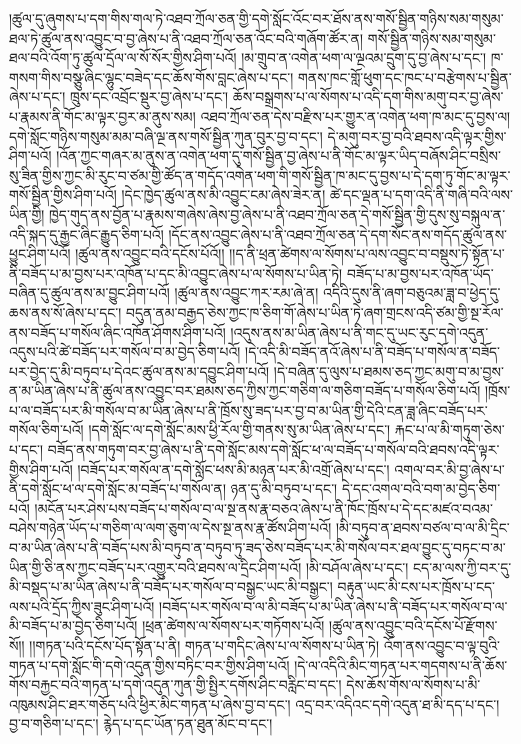 །ཚུལ་དུ་ཞུགས་པ་དག་གིས་གལ་ཏེ་འཐབ་ཀྲོལ་ཅན་གྱི་དགེ་སློང་འོང་བར་ཐོས་ནས་གསོ་སྦྱིན་གཉིས་སམ་གསུམ་ཐལ་ཏེ་ཚུལ་ནས་འབྱུང་བ་བྱ་ཞེས་པ་ནི་འཐབ་ཀྲོལ་ཅན་འོང་བའི་གཞོག་ཚོར་ན། གསོ་སྦྱིན་གཉིས་སམ་གསུམ་ཐལ་བའི་འོག་ཏུ་ཚུལ་དྲོལ་ལ་སོ་སོར་གྱིས་ཤིག་པའོ། །མ་གྲུབ་ན་འགེན་ཕག་ལ་ལྔའམ་དྲུག་དུ་བྱ་ཞེས་པ་དང་། ཁ་གསག་གིས་བསྩུ་ཞིང་ལྷུང་བཟེད་དང་ཆོས་གོས་བླང་ཞེས་པ་དང་། གནས་ཁང་གློ་ཕུག་དང་ཁང་པ་བརྩེགས་པ་སྦྱིན་ཞེས་པ་དང་། ཁྲུས་དང་འབྲོང་སྡུར་བྱ་ཞེས་པ་དང་། ཆོས་བསྒྲགས་པ་ལ་སོགས་པ་འདི་དག་གིས་མགུ་བར་བྱ་ཞེས་པ་རྣམས་ནི་གོང་མ་ལྟར་བྱར་མ་ནུས་སམ། འཐབ་ཀྲོལ་ཅན་དེས་བརྫིས་པར་གྱུར་ན་འགེན་ཕག་ཁ་མང་དུ་བྱས་ལ། དགེ་སློང་གཉིས་གསུམ་མམ་བཞི་ལྔ་ནས་གསོ་སྦྱིན་ཀུན་བུར་བྱ་བ་དང་། དེ་མགུ་བར་བྱ་བའི་ཐབས་འདི་ལྟར་གྱིས་ཤིག་པའོ། །འོན་ཀྱང་གཞར་མ་ནུས་ན་འགེན་ཕག་དུ་གསོ་སྦྱིན་བྱ་ཞེས་པ་ནི་གོང་མ་ལྟར་ཡིད་བཞོས་ཤིང་བསྲིས་སུ་ཟིན་གྱིས་ཀྱང་མི་རུང་བ་ཙམ་གྱི་ཚོད་ན་གདོད་འགེན་ཕག་གི་གསོ་སྦྱིན་ཁ་མང་དུ་བྱས་པ་དེ་དག་ཏུ་གོང་མ་ལྟར་གསོ་སྦྱིན་གྱིས་ཤིག་པའོ། །དེང་ཁྱེད་ཚུལ་ནས་མི་འབྱུང་ངམ་ཞེས་ཟེར་ན། ཚེ་དང་ལྡན་པ་དག་འདི་ནི་གཞི་བའི་ལས་ཡིན་གྱི། ཁྱེད་གུད་ནས་བྱོན་པ་རྣམས་གཞེས་ཞེས་བྱ་ཞེས་པ་ནི་འཐབ་ཀྲོལ་ཅན་དེ་གསོ་སྦྱིན་གྱི་དུས་སུ་བསྐུལ་ན་འདི་སྐད་དུ་རྒྱང་ཞིང་རྒྱུད་ཅིག་པའོ། །དོང་ནས་འབྱུང་ཞེས་པ་ནི་འཐབ་ཀྲོལ་ཅན་དེ་དག་སོང་ནས་གདོད་ཚུལ་ནས་ཕྱུང་ཤིག་པའོ། །ཚུལ་ནས་འབྱུང་བའི་དངོས་པོའོ།། །།ད་ནི་ཕྲན་ཚེགས་ལ་སོགས་པ་ལས་འབྱུང་བ་བསྡུས་ཏེ་སྟོན་པ་ནི་བཟོད་པ་མ་བྱས་པར་འཁོན་པ་དང་མི་འབྱུང་ཞེས་པ་ལ་སོགས་པ་ཡིན་ཏེ། བཟོད་པ་མ་བྱས་པར་འཁོན་ཡོད་བཞིན་དུ་ཚུལ་ནས་མ་བྱུང་ཤིག་པའོ། །ཚུལ་ནས་འབྱུང་ཀར་རམ་ཞེ་ན། འདིའི་དུས་ནི་ཞག་བཅུའམ་ཟླ་བ་ཕྱེད་དུ་ཆས་ནས་སོ་ཞེས་པ་དང་། བདུན་ནམ་བརྒྱད་ཅེས་ཀྱང་ཁ་ཅིག་གོ་ཞེས་པ་ཡིན་ཏེ་ཞག་གྲངས་འདི་ཙམ་གྱི་སྔ་རོལ་ནས་བཟོད་པ་གསོལ་ཞིང་འཁོན་ཤོགས་ཤིག་པའོ། །འདུས་ནས་མ་ཡིན་ཞེས་པ་ནི་གང་དུ་ཡང་རུང་དགེ་འདུན་འདུས་པའི་ཚེ་བཟོད་པར་གསོལ་བ་མ་བྱེད་ཅིག་པའོ། །དེ་འདི་མི་བཟོད་ནའོ་ཞེས་པ་ནི་བཟོད་པ་གསོལ་ན་བཟོད་པར་བྱེད་དུ་མི་བཏུབ་པ་དེའང་ཚུལ་ནས་མ་དབྱུང་ཤིག་པའོ། །དེ་བཞིན་དུ་ལུས་པ་ཐམས་ཅད་ཀྱང་མགུ་བ་མ་བྱས་ན་མ་ཡིན་ཞེས་པ་ནི་ཚུལ་ནས་འབྱུང་བར་ཐམས་ཅད་ཀྱིས་ཀྱང་གཅིག་ལ་གཅིག་བཟོད་པ་གསོལ་ཅིག་པའོ། །ཁྲོས་པ་ལ་བཟོད་པར་མི་གསོལ་བ་མ་ཡིན་ཞེས་པ་ནི་ཁྲོས་སུ་ཟད་པར་བྱ་བ་མ་ཡིན་གྱི་དེའི་ངན་ཟླ་ཞིང་བཟོད་པར་གསོལ་ཅིག་པའོ། །དགེ་སློང་ལ་དགེ་སློང་མས་ཕྱི་རོལ་གྱི་གནས་སུ་མ་ཡིན་ཞེས་པ་དང་། རྐང་པ་ལ་མི་གཏུག་ཅེས་པ་དང་། བཟོད་ནས་གཏུག་བར་བྱ་ཞེས་པ་ནི་དགེ་སློང་མས་དགེ་སློང་ཕ་ལ་བཟོད་པ་གསོལ་བའི་ཐབས་འདི་ལྟར་གྱིས་ཤིག་པའོ། །བཟོད་པར་གསོལ་ན་དགེ་སློང་ཕས་མི་མཉན་པར་མི་འགྲོ་ཞེས་པ་དང་། འགལ་བར་མི་བྱ་ཞེས་པ་ནི་དགེ་སློང་ཕ་ལ་དགེ་སློང་མ་བཟོད་པ་གསོལ་ན། ཉན་དུ་མི་བཏུབ་པ་དང་། དེ་དང་འགལ་བའི་བག་མ་བྱེད་ཅིག་པའོ། །མངོན་པར་ཤེས་པས་བཟོད་པ་གསོལ་བ་ལ་སྔ་ནས་རྣ་བཅའ་ཞེས་པ་ནི་ཁོང་ཁྲོས་པ་དེ་དང་མཛའ་བའམ་བཤེས་གཉེན་ཡོད་པ་གཅིག་ལ་ལག་ཅུག་ལ་དེས་སྔ་ནས་རྣ་ཚོས་ཤིག་པའོ། །མི་བཏུབ་ན་ཐབས་བཙལ་བ་ལ་མི་དྲིང་བ་མ་ཡིན་ཞེས་པ་ནི་བཟོད་པས་མི་བཏུབ་ན་བཏུབ་ཏུ་ཟད་ཅེས་བཟོད་པར་མི་གསོལ་བར་ཐལ་བྱུང་དུ་བཏང་བ་མ་ཡིན་གྱི་ཅི་ནས་ཀྱང་བཟོད་པར་འགྱུར་བའི་ཐབས་ལ་དྲིང་ཤིག་པའོ། །མི་བཤོལ་ཞེས་པ་དང་། ངད་མ་ལས་ཀྱི་བར་དུ་མི་བསྡད་པ་མ་ཡིན་ཞེས་པ་ནི་བཟོད་པར་གསོལ་བ་བསྒྱང་ཡང་མི་བསྒྱང་། བརྟུན་ཡང་མི་ངས་པར་ཁྲོས་པ་ངད་ལས་པའི་དྲོད་ཀྱིས་ཟུང་ཤིག་པའོ། །བཟོད་པར་གསོལ་བ་ལ་མི་བཟོད་པ་མ་ཡིན་ཞེས་པ་ནི་བཟོད་པར་གསོལ་བ་ལ་མི་བཟོད་པ་མ་བྱེད་ཅིག་པའོ། །ཕྲན་ཚེགས་ལ་སོགས་པར་གཏོགས་པའོ། །ཚུལ་ནས་འབྱུང་བའི་དངོས་པོ་རྫོགས་སོ།། །།གཏན་པའི་དངོས་པོད་སྟོན་པ་ནི། གཏན་པ་གདིང་ཞེས་པ་ལ་སོགས་པ་ཡིན་ཏེ། འོག་ནས་འབྱུང་བ་ལྟ་བུའི་གཏན་པ་དགེ་སློང་གི་དགེ་འདུན་གྱིས་བཏིང་བར་གྱིས་ཤིག་པའོ། །དེ་ལ་འདིའི་མིང་གཏན་པར་གདགས་པ་ནི་ཆོས་གོས་བརྐྱང་བའི་གཏན་པ་དགེ་འདུན་ཀུན་གྱི་སྤྱིར་དགོས་ཤིང་བརླིང་བ་དང་། དེས་ཆོས་གོས་ལ་སོགས་པ་མི་འཁུམས་ཤིང་ཐར་གཅོད་པའི་ཕྱིར་མིང་གཏན་པ་ཞེས་བྱ་བ་དང་། འདྲ་བར་འདིའང་དགེ་འདུན་ཐ་མི་དད་པ་དང་། བྱ་བ་གཅིག་པ་དང་། རྙེད་པ་དང་ཡོན་ཏན་ཐུན་མོང་བ་དང་། 